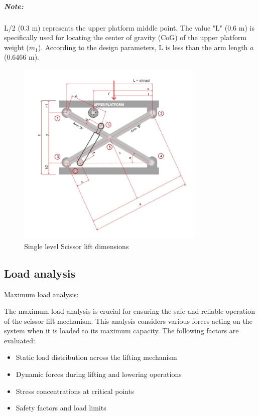 \documentclass[../../main]{subfiles}
\begin{document}
  \subparagraph{Note:} 
  L/2 (0.3 m) represents the upper platform middle point. The
  value "L" (0.6 m) is specifically used for locating the center of
  gravity (CoG) of the upper platform weight ($m_1$). According to the
  design parameters, L is less than the arm length $a$ (0.6466 m).

\begin{figure}[h]
\centering
\includegraphics[width=0.8\textwidth]{img/image005.png}
\caption{Single level Scissor lift dimensions}
\end{figure}
\newpage
\subsection{Load analysis}\label{load-analysis}

Maximum load analysis:

The maximum load analysis is crucial for ensuring the safe and reliable
operation of the scissor lift mechanism. This analysis considers various
forces acting on the system when it is loaded to its maximum capacity.
The following factors are evaluated:

\begin{itemize}
\item
  Static load distribution across the lifting mechanism
\item
  Dynamic forces during lifting and lowering operations
\item
  Stress concentrations at critical points
\item
  Safety factors and load limits
\end{itemize}
\end{document}
